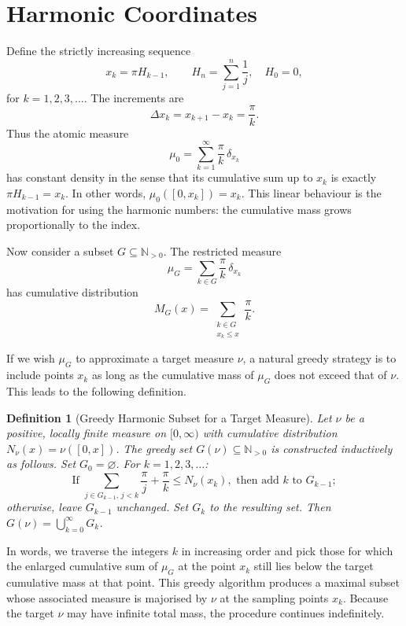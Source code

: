 \documentclass[12pt,a4paper,twoside,openright]{book}
\newtheorem{definition}[theorem]{Definition}
\newcommand{\N}{\mathbb{N}}
\begin{document}
\section{Harmonic Coordinates}

Define the strictly increasing sequence
\[
x_k = \pi H_{k-1}, \qquad H_n = \sum_{j=1}^n \frac{1}{j}, \quad H_0 = 0,
\]
for \(k=1,2,3,\dots\).  The increments are
\[
\Delta x_k = x_{k+1} - x_k = \frac{\pi}{k}.
\]
Thus the atomic measure
\[
\mu_0 = \sum_{k=1}^\infty \frac{\pi}{k}\,\delta_{x_k}
\]
has constant density in the sense that its cumulative sum up to \(x_k\) is exactly \(\pi H_{k-1} = x_k\).  In other words, \(\mu_0([0,x_k]) = x_k\).  This linear behaviour is the motivation for using the harmonic numbers: the cumulative mass grows proportionally to the index.

Now consider a subset \(G\subseteq\N_{>0}\).  The restricted measure
\[
\mu_G = \sum_{k\in G} \frac{\pi}{k}\,\delta_{x_k}
\]
has cumulative distribution
\[
M_G(x) = \sum_{\substack{k\in G\\ x_k\le x}} \frac{\pi}{k}.
\]

If we wish \(\mu_G\) to approximate a target measure \(\nu\), a natural greedy strategy is to include points \(x_k\) as long as the cumulative mass of \(\mu_G\) does not exceed that of \(\nu\).  This leads to the following definition.

\begin{definition}[Greedy Harmonic Subset for a Target Measure]
Let \(\nu\) be a positive, locally finite measure on \([0,\infty)\) with cumulative distribution \(N_\nu(x) = \nu([0,x])\).  The \emph{greedy set} \(G(\nu)\subseteq\N_{>0}\) is constructed inductively as follows.
Set \(G_0 = \varnothing\).  For \(k=1,2,3,\dots\):
\[
\text{If } \sum_{j\in G_{k-1},\, j<k} \frac{\pi}{j} + \frac{\pi}{k} \le N_\nu(x_k), \text{ then add } k \text{ to } G_{k-1};
\]
otherwise, leave \(G_{k-1}\) unchanged.  Set \(G_{k}\) to the resulting set.
Then \(G(\nu) = \bigcup_{k=0}^\infty G_k\).
\end{definition}

In words, we traverse the integers \(k\) in increasing order and pick those for which the enlarged cumulative sum of \(\mu_G\) at the point \(x_k\) still lies below the target cumulative mass at that point.  This greedy algorithm produces a maximal subset whose associated measure is majorised by \(\nu\) at the sampling points \(x_k\).  Because the target \(\nu\) may have infinite total mass, the procedure continues indefinitely.
\end{document}
